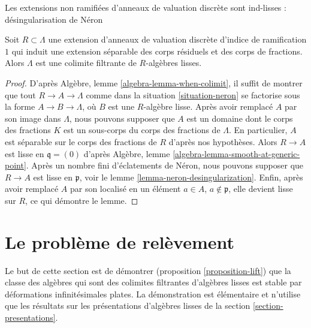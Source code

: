 \begin{lemma}
\label{lemma-neron-colimit}
\begin{slogan}
Les extensions non ramifiées d'anneaux de valuation discrète sont ind-lisses : désingularisation de Néron
\end{slogan}
Soit $R \subset \Lambda$ une extension d'anneaux de valuation
discrète d'indice de ramification $1$ qui induit une extension séparable
des corps résiduels et des corps de fractions.
Alors $\Lambda$ est une colimite filtrante de $R$-algèbres lisses.
\end{lemma}

\begin{proof}
D'après Algèbre, lemme \ref{algebra-lemma-when-colimit}, il suffit de montrer
que tout $R \to A \to \Lambda$ comme dans la situation \ref{situation-neron}
se factorise sous la forme $A \to B \to \Lambda$, où $B$ est une
$R$-algèbre lisse. Après avoir remplacé $A$ par son image dans $\Lambda$,
nous pouvons supposer que $A$ est un domaine dont le corps des fractions $K$
est un sous-corps du corps des fractions de $\Lambda$.
En particulier, $A$ est séparable sur le corps des fractions de $R$
d'après nos hypothèses. Alors $R \to A$ est lisse en $\mathfrak q = (0)$ d'après
Algèbre, lemme \ref{algebra-lemma-smooth-at-generic-point}.
Après un nombre fini d'éclatements de Néron, nous pouvons supposer que $R \to A$
est lisse en $\mathfrak p$, voir le lemme \ref{lemma-neron-desingularization}.
Enfin, après avoir remplacé $A$ par son localisé
en un élément $a \in A$, $a \not \in \mathfrak p$, elle devient
lisse sur $R$, ce qui démontre le lemme.
\end{proof}












\section{Le problème de relèvement}
\label{section-lifting}

\noindent
Le but de cette section est de démontrer (proposition \ref{proposition-lift})
que la classe des algèbres qui sont des colimites filtrantes d'algèbres lisses
est stable par déformations infinitésimales plates. La démonstration est élémentaire
et n'utilise que les résultats sur les présentations d'algèbres lisses de la
section \ref{section-presentations}.

